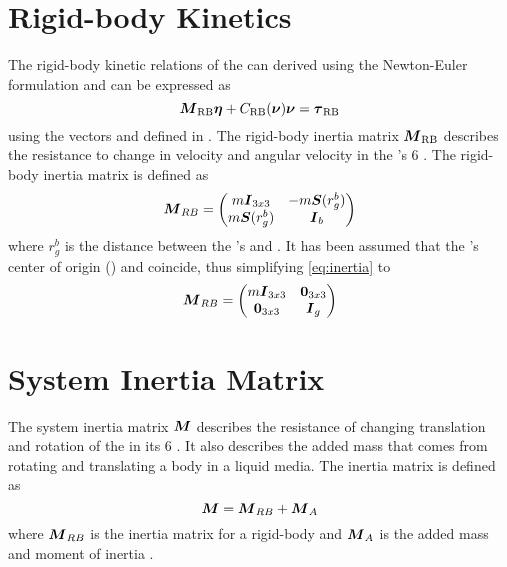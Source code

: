 \section{Rigid-body Kinetics}
The rigid-body kinetic relations of the \abbrROV can derived using the Newton-Euler formulation and can be expressed as
\begin{equation}
\boldsymbol{M}_{\text{RB}}\boldsymbol{\eta} + C_{\text{RB}}(\boldsymbol{\nu})\boldsymbol{\nu} = \boldsymbol{\tau}_{\text{RB}}
\end{equation}
using the vectors \etaVector and \nuVector defined in  \citep[p. 45]{fossen2011}.
The rigid-body inertia matrix $\boldsymbol{M}_{\text{RB}}$ describes the resistance to change in velocity and angular velocity in the \abbrROV's  6 \abbrDOF. The rigid-body inertia matrix is defined as 
\begin{equation}
\label{eq:inertia}
    \boldsymbol{M}_{RB} = 
    \begin{pmatrix}
    m\boldsymbol{I}_{3x3}       & -m\boldsymbol{S}(r^b_g) \\
    m\boldsymbol{S}(r^b_g) & \boldsymbol{I}_{b}
    \end{pmatrix}
\end{equation}
where $r^b_g$ is the distance between the \abbrROV's \abbrCO and \abbrCG \citep[p. 52]{fossen2011}.
It has been assumed that the \abbrROV's center of origin (\abbrCO) and \abbrCG coincide, thus simplifying \eqref{eq:inertia} to
\begin{equation}
   \boldsymbol{M}_{RB} = 
    \begin{pmatrix}
        m\boldsymbol{I}_{3x3} & \boldsymbol{0}_{3x3} \\
        \boldsymbol{0}_{3x3} & \boldsymbol{I}_{g}
    \end{pmatrix}
\end{equation}
\section{System Inertia Matrix}
The system inertia matrix $\boldsymbol{M}$ describes the resistance of changing translation and rotation of the \abbrROV in its 6 \abbrDOF. It also describes the added mass that comes from rotating and translating a body in a liquid media. The inertia matrix is defined as
\begin{equation}
    \boldsymbol{M} = \boldsymbol{M}_{RB}+\boldsymbol{M}_{A}
\end{equation}
where $\boldsymbol{M}_{RB}$ is the inertia matrix for a rigid-body and $\boldsymbol{M}_{A}$ is the added mass and moment of inertia \citep{fossen2011}.  

